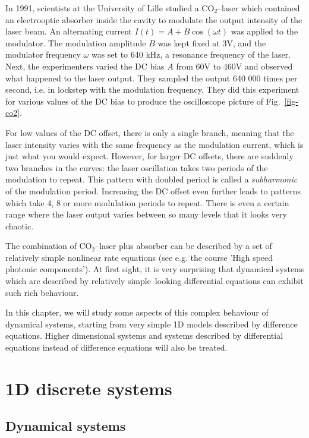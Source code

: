 In 1991, scientists at the University of Lille studied a CO$_2$--laser which contained an electrooptic absorber inside the cavity to modulate the output intensity of the laser beam. An alternating current $I(t)=A+B \cos (\omega t)$ was applied to the modulator. The modulation amplitude $B$ was kept fixed at 3V, and the modulator frequency $\omega$ was set to 640 kHz, a resonance frequency of the laser. Next, the experimenters varied the DC bias $A$ from 60V to 460V and observed what happened to the laser output. They sampled the output 640 000 times per second, i.e. in lockstep with the modulation frequency. They did this experiment for various values of the DC bias to produce the oscilloscope picture of Fig.~\ref{fig-co2}.

For low values of the DC offset, there is only a single branch, meaning that the laser intensity varies with the same frequency as the modulation current, which is just what you would expect. However, for larger DC offsets, there are suddenly two branches in the curves: the laser oscillation takes two periods of the modulation to repeat. This pattern with doubled period is called a \emph{subharmonic} of the modulation period. Increasing the DC offset even further leads to patterns which take 4, 8 or more modulation periods to repeat. There is even a certain range where the laser output varies between so many levels that it looks very chaotic.

The combination of CO$_2$--laser plus absorber can be described by a set of relatively simple nonlinear rate equations (see e.g. the course 'High speed photonic components'). At first sight, it is very surprising that dynamical systems which are described by relatively simple--looking differential equations can exhibit such rich behaviour.

In this chapter, we will study some aspects of this complex behaviour of dynamical systems, starting from very simple 1D models described by difference equations. Higher dimensional systems and systems described by differential equations instead of difference equations will also be treated.

\section{1D discrete systems}

\subsection{Dynamical systems}

